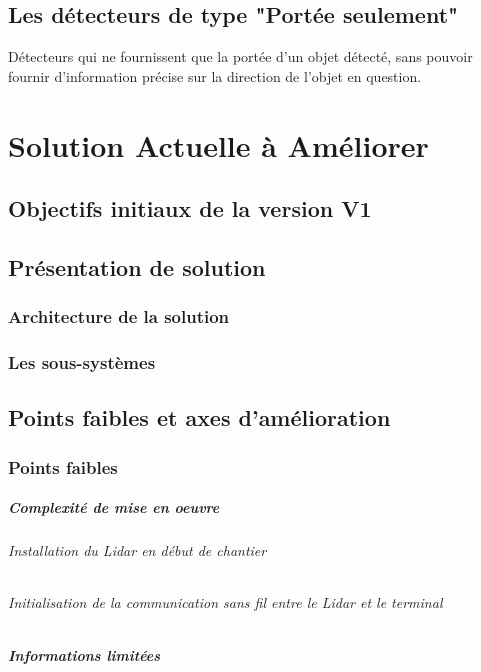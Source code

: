 \documentclass[12pt,a4paper]{report}
\begin{document}
\section{Les détecteurs de type "Portée seulement"}

Détecteurs qui ne fournissent que la portée d'un objet détecté, sans pouvoir fournir d'information précise sur la direction de l'objet en question.



\chapter{Solution Actuelle à Améliorer}

\section{Objectifs initiaux de la version V1}

\section{Présentation de solution}
\subsection{Architecture de la solution}

\subsection{Les sous-systèmes}



\section{Points faibles et axes d'amélioration}

\subsection{Points faibles}

\paragraph{Complexité de mise en oeuvre}
\subparagraph{Installation du Lidar en début de chantier}
\subparagraph{Initialisation de la communication sans fil entre le Lidar et le terminal}

\paragraph{Informations limitées}
\end{document}
